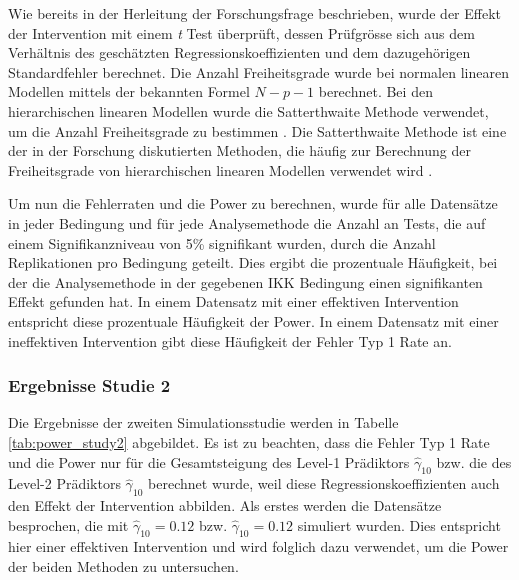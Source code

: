 \documentclass[12pt, a4paper]{article}\usepackage[]{graphicx}\usepackage[]{color}
\begin{document}
Wie bereits in der Herleitung der Forschungsfrage beschrieben, wurde der Effekt der Intervention mit einem \textit{t} Test überprüft, dessen Prüfgrösse sich aus dem Verhältnis des geschätzten Regressionskoeffizienten und dem dazugehörigen Standardfehler berechnet. Die Anzahl Freiheitsgrade wurde bei normalen linearen Modellen mittels der bekannten Formel $N - p - 1$ berechnet. Bei den hierarchischen linearen Modellen wurde die Satterthwaite Methode verwendet, um die Anzahl Freiheitsgrade zu bestimmen \citeyearpar{satter1941synthesis}. Die Satterthwaite Methode ist eine der in der Forschung diskutierten Methoden, die häufig zur Berechnung der Freiheitsgrade von hierarchischen linearen Modellen verwendet wird \citep{raudenbush2002hierarchical,SnijdersTomA.B2012Ma:a}. 

Um nun die Fehlerraten und die Power zu berechnen, wurde für alle Datensätze in jeder Bedingung und für jede Analysemethode die Anzahl an Tests, die auf einem Signifikanzniveau von 5\% signifikant wurden, durch die Anzahl Replikationen pro Bedingung geteilt. Dies ergibt die prozentuale Häufigkeit, bei der die Analysemethode in der gegebenen IKK Bedingung einen signifikanten Effekt gefunden hat. In einem Datensatz mit einer effektiven Intervention entspricht diese prozentuale Häufigkeit der Power. In einem Datensatz mit einer ineffektiven Intervention gibt diese Häufigkeit der Fehler Typ 1 Rate an.

\subsubsection{Ergebnisse Studie 2}
Die Ergebnisse der zweiten Simulationsstudie werden in Tabelle \ref{tab:power_study2} abgebildet. Es ist zu beachten, dass die Fehler Typ 1 Rate und die Power nur für die Gesamtsteigung des Level-1 Prädiktors $\widehat{\gamma}_{10}$ bzw. die des Level-2 Prädiktors $\widehat{\gamma}_{10}$ berechnet wurde, weil diese Regressionskoeffizienten auch den Effekt der Intervention abbilden. Als erstes werden die Datensätze besprochen, die mit $\widehat{\gamma}_{10} = 0.12$ bzw. $\widehat{\gamma}_{10} = 0.12$ simuliert wurden. Dies entspricht hier einer effektiven Intervention und wird folglich dazu verwendet, um die Power der beiden Methoden zu untersuchen.
\end{document}
